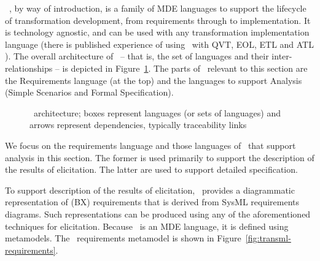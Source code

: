 \transml\ \cite{GuerraLKPS13}, by way of introduction, is a family of MDE languages to support the lifecycle of transformation development, from requirements through to implementation. It is technology agnostic, and can be used with any transformation implementation language (there is published experience of using \transml\ with QVT, EOL, ETL and ATL \cite{GuerraLKPS13}). The overall architecture of \transml\ -- that is, the set of languages and their inter-relationships -- is depicted in Figure~\ref{fig:transML}. The parts of \transml\ relevant to this section are the Requirements language (at the top) and the languages to support Analysis (Simple Scenarios and Formal Specification).

\begin{figure}[htbp]
\caption{\transml\ architecture; boxes represent languages (or sets of languages) and arrows represent dependencies, typically traceability links \cite{GuerraLKPS13}}
\label{fig:transML}
\end{figure}

We focus on the requirements language and those languages of \transml\ that support analysis in this section. The former is used primarily to support the description of the results of elicitation. The latter are used to support detailed specification. 

To support description of the results of elicitation, \transml\ provides a diagrammatic representation of (BX) requirements that is derived from SysML requirements diagrams. Such representations can be produced using any of the aforementioned techniques for elicitation. Because \transml\ is an MDE language, it is defined using metamodels. The \transml\  requirements metamodel is shown in Figure~\ref{fig:transml-requirements}.

